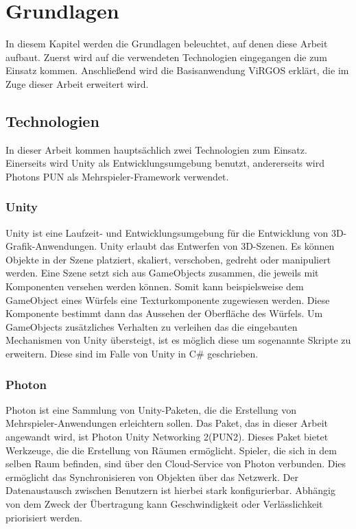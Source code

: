 \section{Grundlagen}
In diesem Kapitel werden die Grundlagen beleuchtet, auf denen diese Arbeit aufbaut. Zuerst wird auf die verwendeten Technologien eingegangen die zum Einsatz kommen. Anschließend wird die Basisanwendung ViRGOS erklärt, die im Zuge dieser Arbeit erweitert wird. 

\subsection{Technologien}

In dieser Arbeit kommen hauptsächlich zwei Technologien zum Einsatz. Einerseits wird Unity als Entwicklungsumgebung benutzt, andererseits wird Photons PUN als Mehrspieler-Framework verwendet. 

\subsubsection*{Unity}
Unity ist eine Laufzeit- und Entwicklungsumgebung für die Entwicklung von 3D-Grafik-Anwendungen. Unity erlaubt das Entwerfen von 3D-Szenen. Es können Objekte in der Szene platziert, skaliert, verschoben, gedreht oder manipuliert werden. Eine Szene setzt sich aus GameObjects zusammen, die jeweils mit Komponenten versehen werden können. Somit kann beispielsweise dem GameObject eines Würfels eine Texturkomponente zugewiesen werden. Diese Komponente bestimmt dann das Aussehen der Oberfläche des Würfels. Um GameObjects zusätzliches Verhalten zu verleihen das die eingebauten Mechanismen von Unity übersteigt, ist es möglich diese um sogenannte Skripte zu erweitern. Diese sind im Falle von Unity in C\# geschrieben.

\subsubsection*{Photon}
Photon ist eine Sammlung von Unity-Paketen, die die Erstellung von Mehrspieler-Anwendungen erleichtern sollen. Das Paket, das in dieser Arbeit angewandt wird, ist \glqq Photon Unity Networking 2\grqq  (PUN2). Dieses Paket bietet Werkzeuge, die die Erstellung von Räumen ermöglicht. Spieler, die sich in dem selben Raum befinden, sind über den Cloud-Service von Photon verbunden. Dies ermöglicht das Synchronisieren von Objekten über das Netzwerk. Der Datenaustausch zwischen Benutzern ist hierbei stark konfigurierbar. Abhängig von dem Zweck der Übertragung kann Geschwindigkeit oder Verlässlichkeit priorisiert werden.

